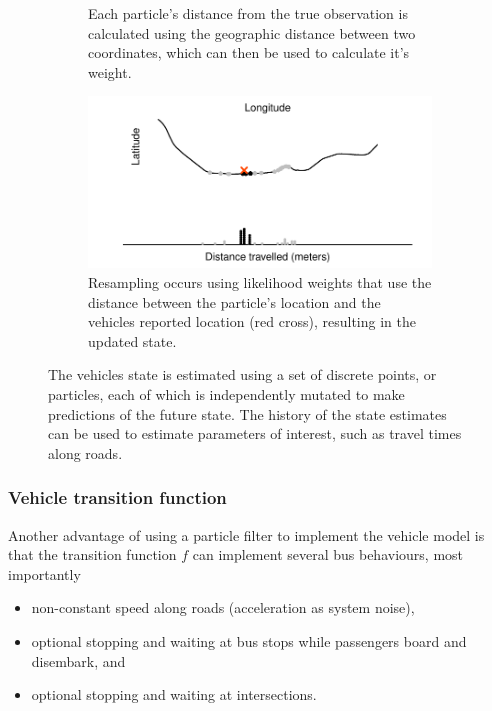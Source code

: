 \begin{figure}[tb]
\begin{subfigure}[t]{0.48\textwidth}
        \caption{Each particle's distance from the true observation is calculated using
            the geographic distance between two coordinates, which can then be used
            to calculate it's weight.}
        \label{fig:pf_state_update}
    \end{subfigure}\;\;
    \begin{subfigure}[t]{0.48\textwidth}
        \centering
        \includegraphics[width=\textwidth]{figures/03_particle_filter_4.pdf}
        \caption{Resampling occurs using likelihood weights that use the distance
            between the particle's location and the vehicles reported location (red cross),
            resulting in the updated state.}
        \label{fig:pf_state_predict2}
    \end{subfigure}
    \caption{The vehicles state is estimated using a set of discrete points, or particles,
        each of which is independently mutated to make predictions of the future state. The history of the state estimates can be used to estimate parameters of interest, such as
        travel times along roads.}
    \label{fig:pf_state}
\end{figure}



\subsubsection{Vehicle transition function}
\label{sec:pf_prediction}

Another advantage of using a particle filter to implement the vehicle model is that
the transition function $f$ can implement several bus behaviours,
most importantly
\begin{itemize}
\item non-constant speed along roads (acceleration as system noise),
\item optional stopping and waiting at bus stops while passengers board and disembark, and
\item optional stopping and waiting at intersections.
\end{itemize}

